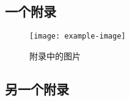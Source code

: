 \cleardoublepage

{

    \appendixmajornumbering

    \subsection{一个附录}

    \begin{figure}[htb]
        \centering
        \texttt{[image: example-image]}
        \caption{附录中的图片}
        \label{fig:test-appendix}
    \end{figure}

    \subsection{另一个附录}
}